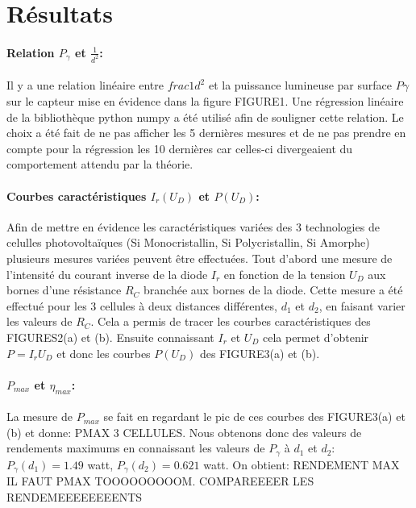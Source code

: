 \section{Résultats}

\paragraph*{Relation \(P_\gamma\) et \(\frac{1}{d^2}\):}
Il y a une relation linéaire entre \(frac{1}{d^2}\) et la puissance lumineuse par surface \(P\gamma\) sur le capteur mise en évidence dans la figure FIGURE1. Une régression linéaire de la bibliothèque python numpy a été utilisé afin de souligner cette relation.
Le choix a été fait de ne pas afficher les 5 dernières mesures et de ne pas prendre en compte pour la régression les 10 dernières car celles-ci divergeaient du comportement attendu par la théorie.

\paragraph*{Courbes caractéristiques \(I_r(U_D)\) et \(P(U_D)\):}
Afin de mettre en évidence les caractéristiques variées des 3 technologies de celulles photovoltaïques (Si Monocristallin, Si Polycristallin, Si Amorphe) plusieurs mesures variées peuvent être effectuées.
Tout d'abord une mesure de l'intensité du courant inverse de la diode \(I_r\) en fonction de la tension \(U_D\) aux bornes d'une résistance \(R_C\) branchée aux bornes de la diode.
Cette mesure a été effectué pour les 3 cellules à deux distances différentes, \(d_1\) et \(d_2\), en faisant varier les valeurs de \(R_C\). Cela a permis de tracer les courbes caractéristiques des FIGURES2(a) et (b).
Ensuite connaissant \(I_r\) et \(U_D\) cela permet d'obtenir \(P = I_r U_D\) et donc les courbes \(P(U_D)\) des FIGURE3(a) et (b).

\paragraph*{\(P_{max}\) et \(\eta_{max}\):}
La mesure de \(P_{max}\) se fait en regardant le pic de ces courbes des FIGURE3(a) et (b) et donne: PMAX 3 CELLULES. 
Nous obtenons donc des valeurs de rendements maximums en connaissant les valeurs de \(P_\gamma\) à \(d_1\) et \(d_2\): \(P_\gamma (d_1) = 1.49\) \unit{watt}, \(P_\gamma (d_2) = 0.621\) \unit{watt}. On obtient: RENDEMENT MAX IL FAUT PMAX TOOOOOOOOOM.
COMPAREEEER LES RENDEMEEEEEEEENTS

